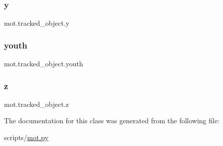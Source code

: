 \subsubsection{\texorpdfstring{y}{y}}
{\footnotesize\ttfamily mot.\+tracked\+\_\+object.\+y}

\mbox{\label{classmot_1_1tracked__object_a28e39b4317941f7dbd7d5c9b1586a414}} 
\subsubsection{\texorpdfstring{youth}{youth}}
{\footnotesize\ttfamily mot.\+tracked\+\_\+object.\+youth}

\mbox{\label{classmot_1_1tracked__object_a557c82a367e7932c8ee09d6173ef8a4c}} 
\subsubsection{\texorpdfstring{z}{z}}
{\footnotesize\ttfamily mot.\+tracked\+\_\+object.\+z}



The documentation for this class was generated from the following file\+:\begin{DoxyCompactItemize}
\item 
scripts/\hyperlink{mot_8py}{mot.\+py}\end{DoxyCompactItemize}
